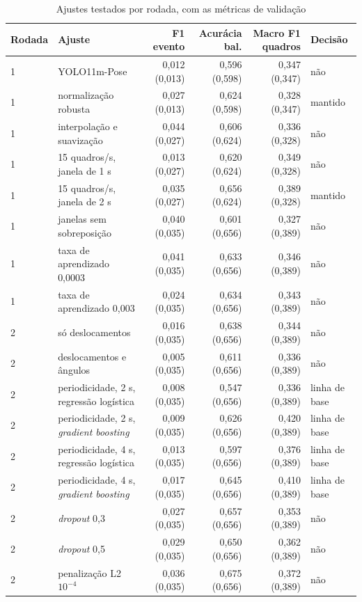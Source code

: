 \begin{table}[htbp]
\centering
\scriptsize
\caption{Ajustes testados por rodada, com as métricas de validação}
\label{tab:rodadas}
\begin{tabular}{llrrrl}
\toprule
Rodada & Ajuste & F1 evento & Acurácia bal. & Macro F1 quadros & Decisão \\
\midrule
1 & YOLO11m-Pose & 0,012 (0,013) & 0,596 (0,598) & 0,347 (0,347) & não \\
1 & normalização robusta & 0,027 (0,013) & 0,624 (0,598) & 0,328 (0,347) & mantido \\
1 & interpolação e suavização & 0,044 (0,027) & 0,606 (0,624) & 0,336 (0,328) & não \\
1 & 15 quadros/s, janela de 1 s & 0,013 (0,027) & 0,620 (0,624) & 0,349 (0,328) & não \\
1 & 15 quadros/s, janela de 2 s & 0,035 (0,027) & 0,656 (0,624) & 0,389 (0,328) & mantido \\
1 & janelas sem sobreposição & 0,040 (0,035) & 0,601 (0,656) & 0,327 (0,389) & não \\
1 & taxa de aprendizado 0,0003 & 0,041 (0,035) & 0,633 (0,656) & 0,346 (0,389) & não \\
1 & taxa de aprendizado 0,003 & 0,024 (0,035) & 0,634 (0,656) & 0,343 (0,389) & não \\
\midrule
2 & só deslocamentos & 0,016 (0,035) & 0,638 (0,656) & 0,344 (0,389) & não \\
2 & deslocamentos e ângulos & 0,005 (0,035) & 0,611 (0,656) & 0,336 (0,389) & não \\
2 & periodicidade, 2 s, regressão logística & 0,008 (0,035) & 0,547 (0,656) & 0,336 (0,389) & linha de base \\
2 & periodicidade, 2 s, \textit{gradient boosting} & 0,009 (0,035) & 0,626 (0,656) & 0,420 (0,389) & linha de base \\
2 & periodicidade, 4 s, regressão logística & 0,013 (0,035) & 0,597 (0,656) & 0,376 (0,389) & linha de base \\
2 & periodicidade, 4 s, \textit{gradient boosting} & 0,017 (0,035) & 0,645 (0,656) & 0,410 (0,389) & linha de base \\
2 & \textit{dropout} 0,3 & 0,027 (0,035) & 0,657 (0,656) & 0,353 (0,389) & não \\
2 & \textit{dropout} 0,5 & 0,029 (0,035) & 0,650 (0,656) & 0,362 (0,389) & não \\
2 & penalização L2 $10^{-4}$ & 0,036 (0,035) & 0,675 (0,656) & 0,372 (0,389) & não \\

\end{tabular}
\end{table}
